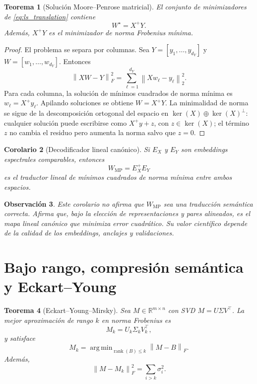 \documentclass[11pt,a4paper]{article}
\newtheorem{theorem}{Teorema}[section]
\newtheorem{corollary}[theorem]{Corolario}
\newtheorem{remark}[theorem]{Observación}
\DeclareMathOperator*{\argmin}{arg\,min}
\DeclareMathOperator{\rank}{rank}
\newcommand{\R}{\mathbb{R}}
\newcommand{\1}{\mathbf{1}}
\newcommand{\norm}[1]{\left\lVert #1 \right\rVert}
\numberwithin{equation}{section}
\begin{document}
\begin{theorem}[Solución Moore--Penrose matricial]
El conjunto de minimizadores de \eqref{eq:ls_translation} contiene
\begin{equation}
    W^\star=X^+Y.
\end{equation}
Además, \(X^+Y\) es el minimizador de norma Frobenius mínima.
\end{theorem}

\begin{proof}
El problema se separa por columnas. Sea \(Y=[y_1,\dots,y_{d_Y}]\) y \(W=[w_1,\dots,w_{d_Y}]\). Entonces
\[
    \norm{XW-Y}_F^2
    =
    \sum_{\ell=1}^{d_Y}
    \norm{Xw_\ell-y_\ell}_2^2.
\]
Para cada columna, la solución de mínimos cuadrados de norma mínima es \(w_\ell=X^+y_\ell\). Apilando soluciones se obtiene \(W=X^+Y\). La minimalidad de norma se sigue de la descomposición ortogonal del espacio en \(\ker(X)\oplus\ker(X)^\perp\): cualquier solución puede escribirse como \(X^+y+z\), con \(z\in\ker(X)\); el término \(z\) no cambia el residuo pero aumenta la norma salvo que \(z=0\).
\end{proof}

\begin{corollary}[Decodificador lineal canónico]
Si \(E_X\) y \(E_Y\) son embeddings espectrales comparables, entonces
\begin{equation}
    W_{\mathrm{MP}}=E_X^+E_Y
\end{equation}
es el traductor lineal de mínimos cuadrados de norma mínima entre ambos espacios.
\end{corollary}

\begin{remark}
Este corolario no afirma que \(W_{\mathrm{MP}}\) sea una traducción semántica correcta. Afirma que, bajo la elección de representaciones y pares alineados, es el mapa lineal canónico que minimiza error cuadrático. Su valor científico depende de la calidad de los embeddings, anclajes y validaciones.
\end{remark}

\section{Bajo rango, compresión semántica y Eckart--Young}

\begin{theorem}[Eckart--Young--Mirsky]
Sea \(M\in\R^{m\times n}\) con SVD \(M=U\Sigma V^\top\). La mejor aproximación de rango \(k\) en norma Frobenius es
\begin{equation}
    M_k=U_k\Sigma_k V_k^\top,
\end{equation}
y satisface
\begin{equation}
    M_k=\argmin_{\rank(B)\leq k}\norm{M-B}_F.
\end{equation}
Además,
\begin{equation}
    \norm{M-M_k}_F^2
    =
    \sum_{i>k}\sigma_i^2.
\end{equation}
\end{theorem}
\end{document}
